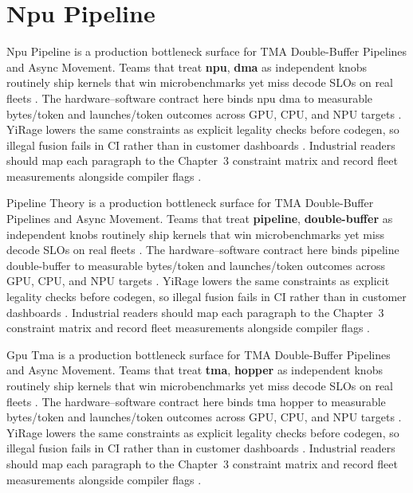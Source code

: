 \section{Npu Pipeline}
\label{sec:npu_pipeline}

Npu Pipeline is a production bottleneck surface for TMA Double-Buffer Pipelines and Async Movement. Teams that treat \textbf{npu}, \textbf{dma} as independent knobs routinely ship kernels that win microbenchmarks yet miss decode SLOs on real fleets \citep{nvidia2022hopper,amd2024aie}. The hardware--software contract here binds npu dma to measurable bytes/token and launches/token outcomes across GPU, CPU, and NPU targets \citep{semianalysis2024tma,dlbook}. YiRage lowers the same constraints as explicit legality checks before codegen, so illegal fusion fails in CI rather than in customer dashboards \citep{amd2024xdna,dao2022flashattention}. Industrial readers should map each paragraph to the Chapter~3 constraint matrix and record fleet measurements alongside compiler flags \citep{amd2024aie,kwon2023vllm}.

Pipeline Theory is a production bottleneck surface for TMA Double-Buffer Pipelines and Async Movement. Teams that treat \textbf{pipeline}, \textbf{double-buffer} as independent knobs routinely ship kernels that win microbenchmarks yet miss decode SLOs on real fleets \citep{taxbreak2026,semianalysis2024tma}. The hardware--software contract here binds pipeline double-buffer to measurable bytes/token and launches/token outcomes across GPU, CPU, and NPU targets \citep{memoryfloor2026,amd2024xdna}. YiRage lowers the same constraints as explicit legality checks before codegen, so illegal fusion fails in CI rather than in customer dashboards \citep{nvidia2022hopper,amd2024aie}. Industrial readers should map each paragraph to the Chapter~3 constraint matrix and record fleet measurements alongside compiler flags \citep{semianalysis2024tma,dlbook}.

Gpu Tma is a production bottleneck surface for TMA Double-Buffer Pipelines and Async Movement. Teams that treat \textbf{tma}, \textbf{hopper} as independent knobs routinely ship kernels that win microbenchmarks yet miss decode SLOs on real fleets \citep{memoryfloor2026,amd2024xdna}. The hardware--software contract here binds tma hopper to measurable bytes/token and launches/token outcomes across GPU, CPU, and NPU targets \citep{nvidia2022hopper,amd2024aie}. YiRage lowers the same constraints as explicit legality checks before codegen, so illegal fusion fails in CI rather than in customer dashboards \citep{semianalysis2024tma,dlbook}. Industrial readers should map each paragraph to the Chapter~3 constraint matrix and record fleet measurements alongside compiler flags \citep{amd2024xdna,dao2022flashattention}.

